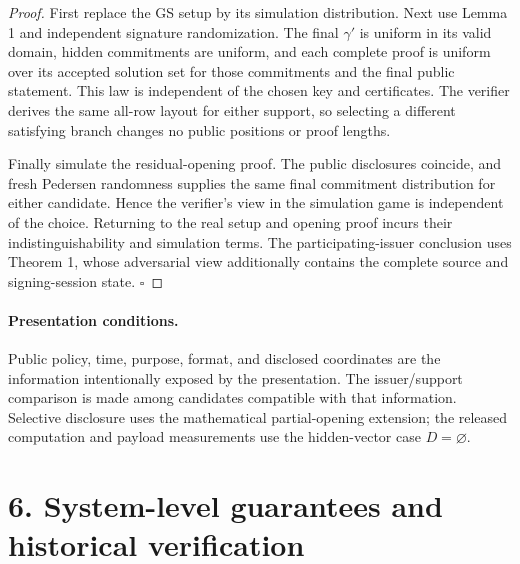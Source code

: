 \documentclass[11pt]{article}
\begin{document}
\begin{proof}
First replace the GS setup by its simulation distribution. Next use Lemma 1 and independent signature randomization. The final \(\gamma'\) is uniform in its valid domain, hidden commitments are uniform, and each complete proof is uniform over its accepted solution set for those commitments and the final public statement. This law is independent of the chosen key and certificates. The verifier derives the same all-row layout for either support, so selecting a different satisfying branch changes no public positions or proof lengths.

Finally simulate the residual-opening proof. The public disclosures coincide, and fresh Pedersen randomness supplies the same final commitment distribution for either candidate. Hence the verifier's view in the simulation game is independent of the choice. Returning to the real setup and opening proof incurs their indistinguishability and simulation terms. The participating-issuer conclusion uses Theorem 1, whose adversarial view additionally contains the complete source and signing-session state. \(\square\)

\end{proof}
\paragraph{Presentation conditions.}
Public policy, time, purpose, format, and disclosed coordinates are the information intentionally exposed by the presentation. The issuer/support comparison is made among candidates compatible with that information. Selective disclosure uses the mathematical partial-opening extension; the released computation and payload measurements use the hidden-vector case \(D=\varnothing\).

\section*{6. System-level guarantees and historical verification}
\end{document}
